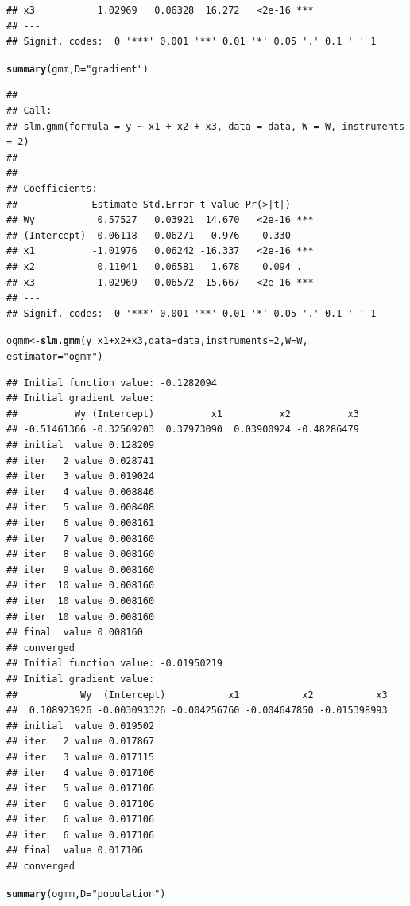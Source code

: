 \documentclass[english,12pt]{book}\usepackage[]{graphicx}\usepackage[]{xcolor}
\makeatletter
\newcommand{\hlnum}[1]{\textcolor[rgb]{0.686,0.059,0.569}{#1}}%
\newcommand{\hlsng}[1]{\textcolor[rgb]{0.192,0.494,0.8}{#1}}%
\newcommand{\hlopt}[1]{\textcolor[rgb]{0,0,0}{#1}}%
\newcommand{\hldef}[1]{\textcolor[rgb]{0.345,0.345,0.345}{#1}}%
\newcommand{\hlkwb}[1]{\textcolor[rgb]{0.69,0.353,0.396}{#1}}%
\newcommand{\hlkwc}[1]{\textcolor[rgb]{0.333,0.667,0.333}{#1}}%
\newcommand{\hlkwd}[1]{\textcolor[rgb]{0.737,0.353,0.396}{\textbf{#1}}}%
\newenvironment{kframe}{%
 \def\at@end@of@kframe{}%
 \ifinner\ifhmode%
  \def\at@end@of@kframe{\end{minipage}}%
  \begin{minipage}{\columnwidth}%
 \fi\fi%
 \def\FrameCommand##1{\hskip\@totalleftmargin \hskip-\fboxsep
 \colorbox{shadecolor}{##1}\hskip-\fboxsep
     \hskip-\linewidth \hskip-\@totalleftmargin \hskip\columnwidth}%
 \MakeFramed {\advance\hsize-\width
   \@totalleftmargin\z@ \linewidth\hsize
   \@setminipage}}%
 {\par\unskip\endMakeFramed%
 \at@end@of@kframe}
\newenvironment{knitrout}{}{} %
\let\hlstd\hldef
\let\hlstr\hlsng
\makeatother
\begin{document}
\begin{knitrout}
\begin{kframe}
\begin{verbatim}
## x3           1.02969   0.06328  16.272   <2e-16 ***
## ---
## Signif. codes:  0 '***' 0.001 '**' 0.01 '*' 0.05 '.' 0.1 ' ' 1
\end{verbatim}
\begin{alltt}
\hlkwd{summary}\hlstd{(gmm,} \hlkwc{D} \hlstd{=} \hlstr{"gradient"}\hlstd{)}
\end{alltt}
\begin{verbatim}
## 
## Call:
## slm.gmm(formula = y ~ x1 + x2 + x3, data = data, W = W, instruments = 2)
## 
## 
## Coefficients:
##             Estimate Std.Error t-value Pr(>|t|)    
## Wy           0.57527   0.03921  14.670   <2e-16 ***
## (Intercept)  0.06118   0.06271   0.976    0.330    
## x1          -1.01976   0.06242 -16.337   <2e-16 ***
## x2           0.11041   0.06581   1.678    0.094 .  
## x3           1.02969   0.06572  15.667   <2e-16 ***
## ---
## Signif. codes:  0 '***' 0.001 '**' 0.01 '*' 0.05 '.' 0.1 ' ' 1
\end{verbatim}
\begin{alltt}
\hlstd{ogmm} \hlkwb{<-} \hlkwd{slm.gmm}\hlstd{(y} \hlopt{~} \hlstd{x1} \hlopt{+} \hlstd{x2} \hlopt{+} \hlstd{x3,} \hlkwc{data} \hlstd{= data,} \hlkwc{instruments} \hlstd{=} \hlnum{2}\hlstd{,} \hlkwc{W} \hlstd{= W,}
                \hlkwc{estimator} \hlstd{=} \hlstr{"ogmm"}\hlstd{)}
\end{alltt}
\begin{verbatim}
## Initial function value: -0.1282094 
## Initial gradient value:
##          Wy (Intercept)          x1          x2          x3 
## -0.51461366 -0.32569203  0.37973090  0.03900924 -0.48286479 
## initial  value 0.128209 
## iter   2 value 0.028741
## iter   3 value 0.019024
## iter   4 value 0.008846
## iter   5 value 0.008408
## iter   6 value 0.008161
## iter   7 value 0.008160
## iter   8 value 0.008160
## iter   9 value 0.008160
## iter  10 value 0.008160
## iter  10 value 0.008160
## iter  10 value 0.008160
## final  value 0.008160 
## converged
## Initial function value: -0.01950219 
## Initial gradient value:
##           Wy  (Intercept)           x1           x2           x3 
##  0.108923926 -0.003093326 -0.004256760 -0.004647850 -0.015398993 
## initial  value 0.019502 
## iter   2 value 0.017867
## iter   3 value 0.017115
## iter   4 value 0.017106
## iter   5 value 0.017106
## iter   6 value 0.017106
## iter   6 value 0.017106
## iter   6 value 0.017106
## final  value 0.017106 
## converged
\end{verbatim}
\begin{alltt}
\hlkwd{summary}\hlstd{(ogmm,} \hlkwc{D} \hlstd{=} \hlstr{"population"}\hlstd{)}

\end{alltt}
\end{kframe}
\end{knitrout}
\end{document}
